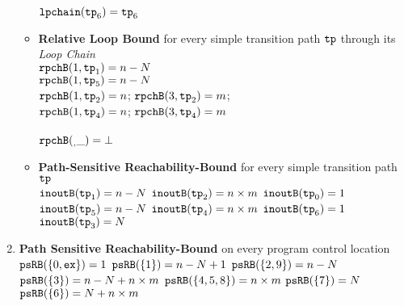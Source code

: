 \begin{enumerate}
\begin{itemize}
  $\mathtt{lpchain}(\mathtt{tp}_6) = \mathtt{tp}_6$ 
  \item \textbf{{Relative Loop Bound}} for every simple transition path $\mathtt{tp}$ through its \emph{Loop Chain}
  \\
  $\mathtt{rpchB}(1, \mathtt{tp}_1) = n - N$ \\
  $\mathtt{rpchB}(1, \mathtt{tp}_5) = n - N$ \\
  $\mathtt{rpchB}(1, \mathtt{tp}_2) = n$; \quad $\mathtt{rpchB}(3, \mathtt{tp}_2) = m$; \\
  $\mathtt{rpchB}(1, \mathtt{tp}_4) = n$; \quad $\mathtt{rpchB}(3, \mathtt{tp}_4) = m$ \\
   \\
  $\mathtt{rpchB}(_, \_) = \bot $ 
  \item \textbf{Path-Sensitive Reachability-Bound} for every simple transition path $\mathtt{tp}$
  \\
  $\mathtt{inoutB}(\mathtt{tp}_1) = n - N$ \quad
  $\mathtt{inoutB}(\mathtt{tp}_2) = n \times m$ \quad
  $\mathtt{inoutB}(\mathtt{tp}_0) = 1$ 
  \\
  $\mathtt{inoutB}(\mathtt{tp}_5) = n - N$ \quad
  $\mathtt{inoutB}(\mathtt{tp}_4) = n \times m$ \quad
  $\mathtt{inoutB}(\mathtt{tp}_6) = 1$ 
  \\
  $\mathtt{inoutB}(\mathtt{tp}_3) = N$ \quad
\end{itemize}
\item \textbf{Path Sensitive Reachability-Bound} on every program control location
\\
$\mathtt{psRB}(\{0, \mathtt{ex}\}) = 1$ \quad
$\mathtt{psRB}(\{1\}) = n - N + 1$ \quad
$\mathtt{psRB}(\{2, 9\}) = n - N$ \quad
$\mathtt{psRB}(\{3\}) = n - N + n \times m$ \quad
$\mathtt{psRB}(\{4, 5, 8\}) = n \times m$ \quad
$\mathtt{psRB}(\{7\}) = N$ \quad
$\mathtt{psRB}(\{6\}) = N + n \times m$ 
\end{enumerate}